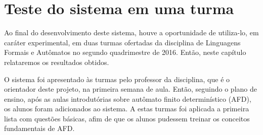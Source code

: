 \documentclass[
	12pt,				%
	openany,
	oneside,
	a4paper,			%
	english,			%
	brazil				%
	]{abntex2}
\begin{document}

 



\chapter[Teste do sistema em uma turma]{Teste do sistema em uma turma}
  
  Ao final do desenvolvimento deste sistema, houve a oportunidade de utiliza-lo, em caráter experimental, em duas turmas ofertadas da disciplina de Linguagens Formais e Autômatos no segundo quadrimestre de 2016. Então, neste capítulo relataremos os resultados obtidos.


  O sistema foi apresentado às turmas pelo professor da disciplina, que é o orientador deste projeto, na primeira semana de aula. Então, seguindo o plano de ensino, após as aulas introdutórias sobre autômato finito determinístico (AFD), os alunos foram adicionados ao sistema. A estas turmas foi aplicada a primeira lista com questões básicas, afim de que os alunos pudessem treinar os conceitos fundamentais de AFD.
  
\end{document}
